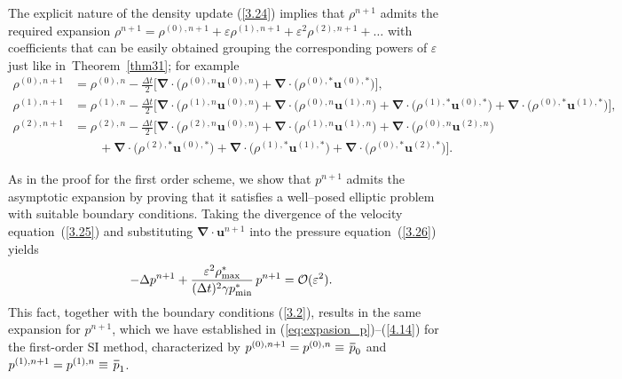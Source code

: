 \documentclass[A4paper,12pt,twoside]{article}
\newenvironment{proof}{{\flushleft \bf Proof:}}{}
\numberwithin{equation}{section}
\numberwithin{figure}{section}
\numberwithin{table}{section}
\def\muu {\bm{u}}
\def\bnabla{\bm{\nabla}}
\newcommand{\dt}{\Delta t}
\newcommand{\ve}{\varepsilon}
\newcommand\eref[1]{(\ref{#1})}
\newcommand*\xbar[1]{%
  \hbox{%
    \vbox{%
      \hrule height 0.5pt %
      \kern0.4ex%
      \hbox{%
        \kern-0.05em%
        \ensuremath{#1}%
        \kern-0.00em%
      }%
    }%
  }%
}
\begin{document}
\begin{proof}
The explicit nature of the density update \eref{3.24} implies that $\rho^{n+1}$ admits the required expansion
$\rho^{n+1}=\rho^{(0),n+1}+\ve\rho^{(1),n+1}+\ve^2\rho^{(2),n+1}+\dots$ with coefficients that can be easily obtained grouping the corresponding powers of $\ve$ just like in~Theorem~\ref{thm31}; for example
\begin{align*}
	\rho^{(0),n+1}&=\rho^{(0),n}-\frac{\dt}{2}\big[ \bnabla\!\cdot\!\big(\rho^{(0),n}\bm u^{(0),n}\big) + \bnabla\!\cdot\!\big(\rho^{(0),*}\bm u^{(0),*}\big) \big],\\
	\rho^{(1),n+1}&=\rho^{(1),n}-\frac{\dt}{2} \big[\bnabla\!\cdot\!\big(\rho^{(1),n}\bm u^{(0),n}\big)+\bnabla\!\cdot\!\big(\rho^{(0),n}\bm u^{(1),n}\big)+\bnabla\!\cdot\!\big(\rho^{(1),*}\bm u^{(0),*}\big)+\bnabla\!\cdot\!\big(\rho^{(0),*}\bm u^{(1),*}\big)\big],\\
	\rho^{(2),n+1}&=\rho^{(2),n}-\frac{\dt}{2} \big[\bnabla\!\cdot\!\big(\rho^{(2),n}\bm u^{(0),n}\big)+\bnabla\!\cdot\!\big(\rho^{(1),n}\bm u^{(1),n}\big)+\bnabla\!\cdot\!\big(\rho^{(0),n}\bm u^{(2),n}\big) \\
	&\qquad+\bnabla\!\cdot\!\big(\rho^{(2),*}\bm u^{(0),*}\big)+\bnabla\!\cdot\!\big(\rho^{(1),*}\bm u^{(1),*}\big)+\bnabla\!\cdot\!\big(\rho^{(0),*}\bm u^{(2),*}\big)\big].
\end{align*}

As in the proof for the first order scheme, we show that $p^{n+1}$ admits the asymptotic expansion by proving that it satisfies a well--posed elliptic problem with suitable boundary conditions.
Taking the divergence of the velocity equation~\eref{3.25} and substituting $\bnabla\!\cdot\!\muu^{n+1}$
into the pressure equation~\eref{3.26} yields
$$
-\Delta p^{n+1}+\frac{\ve^2\rho_{\max}^*}{(\dt)^2\gamma p_{\min}^*}\,p^{n+1}={\cal O}(\ve^2).
$$
This fact, 
together with the boundary conditions \eref{3.2}, results in the same expansion for
$p^{n+1}$, which we have established in \eref{eq:expasion_p}--\eref{4.14} for the first-order SI method, characterized by $p^{(0),n+1}=p^{(0),n}\equiv\,\xbar p_0$ and $p^{(1),n+1}=p^{(1),n}\equiv\,\xbar p_1$.


\end{proof}
\end{document}
